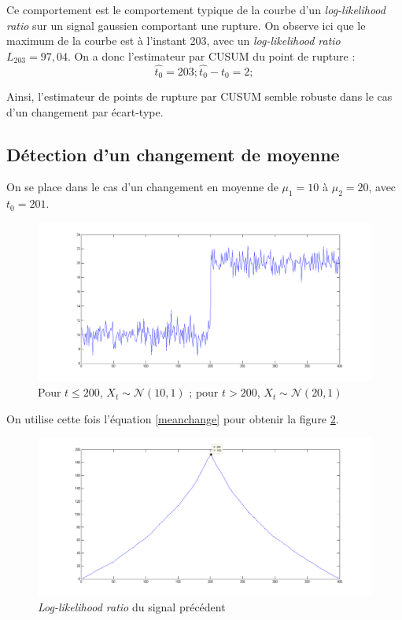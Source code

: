 \documentclass[french,12pt,notitlepage]{report}
\begin{document}
	Ce comportement est le comportement typique de la courbe d'un \textit{log-likelihood ratio} sur un signal gaussien comportant une rupture. On observe ici que le maximum de la courbe est à l'instant 203, avec un \textit{log-likelihood ratio} $L_203 = 97,04$. On a donc l'estimateur par CUSUM du point de rupture :
	\begin{equation*}
		\hat{t_0} = 203 ; \hat{t_0} - t_0 = 2;
	\end{equation*}
	
	Ainsi, l'estimateur de points de rupture par CUSUM semble robuste dans le cas d'un changement par écart-type.
	
	\subsection{Détection d'un changement de moyenne}
	On se place dans le cas d'un changement en moyenne de $\mu_1 = 10$ à $\mu_2 = 20$, avec $t_0 = 201$.
	
	\begin{figure}[h]
		\includegraphics[scale=0.35]{test_signal_mean.png}
		\caption{Pour $t \leq 200$, $X_t \sim \mathcal{N}(10, 1)$ ; pour $t > 200$, $X_t \sim \mathcal{N}(20, 1)$}
		\label{test_signal_mean}
	\end{figure}
	
	On utilise cette fois l'équation \ref{meanchange} pour obtenir la figure \ref{llr_test_mean}.
	
	\begin{figure}[h]
		\includegraphics[scale=0.4]{llr_test_mean.png}
		\caption{\textit{Log-likelihood ratio} du signal précédent}
		\label{llr_test_mean}
	\end{figure}
	
\end{document}
